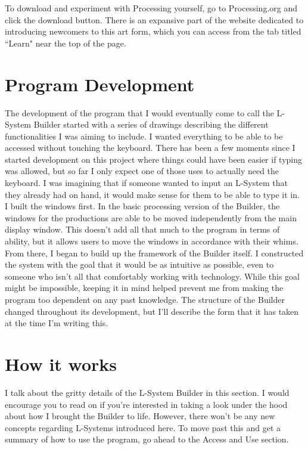 \documentclass[12pt,twoside]{reedthesis}
\begin{document}
	To download and experiment with Processing yourself, go to Processing.org and click the download button. There is an expansive part of the website dedicated to introducing newcomers to this art form, which you can access from the tab titled ``Learn" near the top of the page.\\

\section{Program Development}

	The development of the program that I would eventually come to call the L-System Builder started with a series of drawings describing the different functionalities I was aiming to include. I wanted everything to be able to be accessed without touching the keyboard. There has been a few moments since I started development on this project where things could have been easier if typing was allowed, but so far I only expect one of those uses to actually need the keyboard. I was imagining that if someone wanted to input an L-System that they already had on hand, it would make sense for them to be able to type it in.\\
	
	I built the windows first. In the basic processing version of the Builder, the windows for the productions are able to be moved independently from the main display window. This doesn't add all that much to the program in terms of ability, but it allows users to move the windows in accordance with their whims. From there, I began to build up the framework of the Builder itself. I constructed the system with the goal that it would be as intuitive as possible, even to someone who isn't all that comfortably working with technology. While this goal might be impossible, keeping it in mind helped prevent me from making the program too dependent on any past knowledge. The structure of the Builder changed throughout its development, but I'll describe the form that it has taken at the time I'm writing this.\\
	
\section{How it works}

	I talk about the gritty details of the L-System Builder in this section. I would encourage you to read on if you're interested in taking a look under the hood about how I brought the Builder to life. However, there won't be any new concepts regarding L-Systems introduced here. To move past this and get a summary of how to use the program, go ahead to the Access and Use section.\\
	
\end{document}
